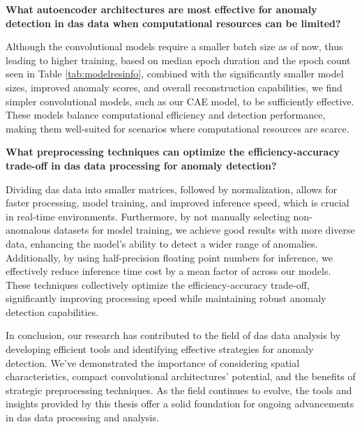 \textbf{What autoencoder architectures are most effective for anomaly detection in \acrshort{das} data when computational resources can be limited?}

Although the convolutional models require a smaller batch size as of now, thus leading to higher training, based on median epoch duration and the epoch count seen in Table \ref{tab:modelresinfo}, combined with the significantly smaller model sizes, improved anomaly scores, and overall reconstruction capabilities, we find simpler convolutional models, such as our CAE model, to be sufficiently effective. These models balance computational efficiency and detection performance, making them well-suited for scenarios where computational resources are scarce.

\textbf{What preprocessing techniques can optimize the efficiency-accuracy trade-off in \acrshort{das} data processing for anomaly detection?}

Dividing \acrshort{das} data into smaller matrices, followed by normalization, allows for faster processing, model training, and improved inference speed, which is crucial in real-time environments. Furthermore, by not manually selecting non-anomalous datasets for model training, we achieve good results with more diverse data, enhancing the model's ability to detect a wider range of anomalies. Additionally, by using half-precision floating point numbers for inference, we effectively reduce inference time cost by a mean factor of  across our models. These techniques collectively optimize the efficiency-accuracy trade-off, significantly improving processing speed while maintaining robust anomaly detection capabilities.

In conclusion, our research has contributed to the field of \acrshort{das} data analysis by developing efficient tools and identifying effective strategies for anomaly detection. We've demonstrated the importance of considering spatial characteristics, compact convolutional architectures' potential, and the benefits of strategic preprocessing techniques. As the field continues to evolve, the tools and insights provided by this thesis offer a solid foundation for ongoing advancements in \acrshort{das} data processing and analysis.


